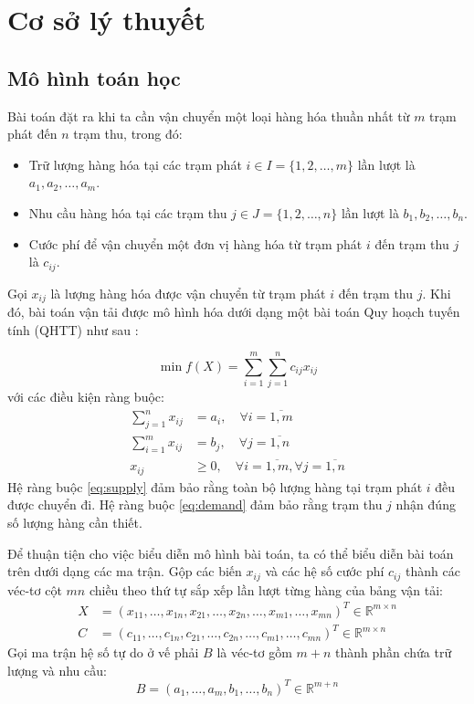 \documentclass[../main.tex]{subfiles}
\begin{document}
\chapter{Cơ sở lý thuyết}

\section{Mô hình toán học}
    
Bài toán đặt ra khi ta cần vận chuyển một loại hàng hóa thuần nhất từ $m$ trạm phát đến $n$ trạm thu, trong đó:
\begin{itemize}
    \item Trữ lượng hàng hóa tại các trạm phát $i \in I = \{1, 2, \dots, m\}$ lần lượt là $a_1, a_2, \dots, a_m$.
    \item Nhu cầu hàng hóa tại các trạm thu $j \in J = \{1, 2, \dots, n\}$ lần lượt là $b_1, b_2, \dots, b_n$.
    \item Cước phí để vận chuyển một đơn vị hàng hóa từ trạm phát $i$ đến trạm thu $j$ là $c_{ij}$.
\end{itemize}

Gọi $x_{ij}$ là lượng hàng hóa được vận chuyển từ trạm phát $i$ đến trạm thu $j$. Khi đó, bài toán vận tải được mô hình hóa dưới dạng một bài toán Quy hoạch tuyến tính (QHTT) như sau \cite{hitchcock1941, kantorovich1939, koopmans1949}:
    
\begin{equation} \label{eq:objective}
    \min f(X) = \sum_{i=1}^{m} \sum_{j=1}^{n} c_{ij} x_{ij}
\end{equation}
với các điều kiện ràng buộc:
\begin{align}
    \sum_{j=1}^{n} x_{ij} &= a_i, \quad \forall i = \overline{1,m} \label{eq:supply} \\
    \sum_{i=1}^{m} x_{ij} &= b_j, \quad \forall j = \overline{1,n} \label{eq:demand} \\
    x_{ij} &\ge 0, \quad \forall i = \overline{1,m}, \forall j = \overline{1,n} \label{eq:nonnegative}
\end{align}
Hệ ràng buộc \eqref{eq:supply} đảm bảo rằng toàn bộ lượng hàng tại trạm phát $i$ đều được chuyển đi. Hệ ràng buộc \eqref{eq:demand} đảm bảo rằng trạm thu $j$ nhận đúng số lượng hàng cần thiết.

Để thuận tiện cho việc biểu diễn mô hình bài toán, ta có thể biểu diễn bài toán trên dưới dạng các ma trận. Gộp các biến $x_{ij}$ và các hệ số cước phí $c_{ij}$ thành các véc-tơ cột $mn$ chiều theo thứ tự sắp xếp lần lượt từng hàng của bảng vận tải:
\begin{align*}
    X &= (x_{11}, \dots, x_{1n}, x_{21}, \dots, x_{2n}, \dots, x_{m1}, \dots, x_{mn})^T \in \mathbb{R}^{m \times n} \\
    C &= (c_{11}, \dots, c_{1n}, c_{21}, \dots, c_{2n}, \dots, c_{m1}, \dots, c_{mn})^T \in \mathbb{R}^{m \times n}
\end{align*}
Gọi ma trận hệ số tự do ở vế phải $B$ là véc-tơ gồm $m+n$ thành phần chứa trữ lượng và nhu cầu:
\[ B = (a_1, \dots, a_m, b_1, \dots, b_n)^T \in \mathbb{R}^{m+n} \]
\end{document}
